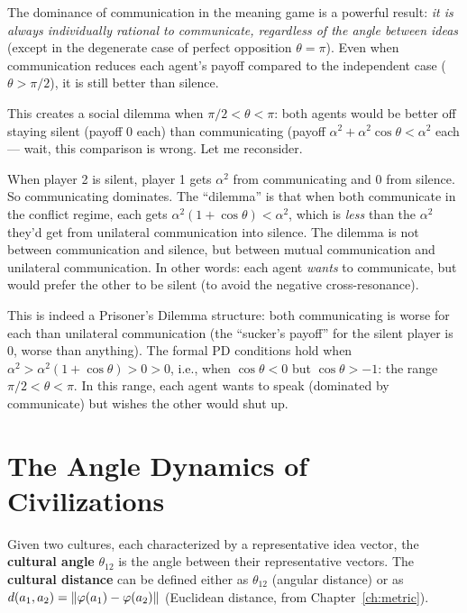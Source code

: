 \begin{interpretation}
\label{interp:compulsion}
The dominance of communication in the meaning game is a powerful result:
\emph{it is always individually rational to communicate, regardless of the
angle between ideas} (except in the degenerate case of perfect opposition
$\theta = \pi$). Even when communication reduces each agent's payoff compared
to the independent case ($\theta > \pi/2$), it is still better than silence.

This creates a social dilemma when $\pi/2 < \theta < \pi$: both agents would
be better off staying silent (payoff 0 each) than communicating (payoff
$\alpha^2 + \alpha^2\cos\theta < \alpha^2$ each --- wait, this comparison is
wrong. Let me reconsider.

When player 2 is silent, player 1 gets $\alpha^2$ from communicating and $0$
from silence. So communicating dominates. The ``dilemma'' is that when both
communicate in the conflict regime, each gets $\alpha^2(1 + \cos\theta) <
\alpha^2$, which is \emph{less} than the $\alpha^2$ they'd get from
unilateral communication into silence. The dilemma is not between communication
and silence, but between mutual communication and unilateral communication.
In other words: each agent \emph{wants} to communicate, but would prefer the
other to be silent (to avoid the negative cross-resonance).

This is indeed a Prisoner's Dilemma structure: both communicating is worse
for each than unilateral communication (the ``sucker's payoff'' for the
silent player is $0$, worse than anything). The formal PD conditions hold when
$\alpha^2 > \alpha^2(1 + \cos\theta) > 0 > 0$, i.e., when $\cos\theta < 0$
but $\cos\theta > -1$: the range $\pi/2 < \theta < \pi$. In this range, each
agent wants to speak (dominated by communicate) but wishes the other would
shut up.
\end{interpretation}


\section{The Angle Dynamics of Civilizations}

\begin{definition}
\label{def:cultural-distance}
Given two cultures, each characterized by a representative idea vector, the
\textbf{cultural angle} $\theta_{12}$ is the angle between their representative
vectors. The \textbf{cultural distance} can be defined either as $\theta_{12}$
(angular distance) or as $d(a_1, a_2) = \lVert \varphi(a_1) - \varphi(a_2) \rVert$
(Euclidean distance, from Chapter~\ref{ch:metric}).
\end{definition}

